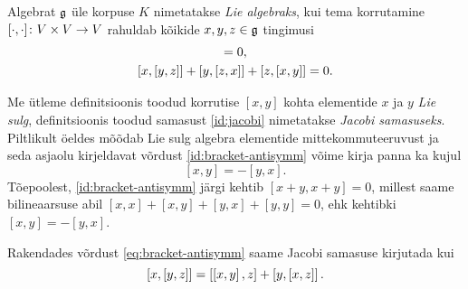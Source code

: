 \begin{dfn}
    Algebrat $\mathfrak{g}$ üle korpuse $K$ nimetatakse \emph{Lie algebraks}, kui
    tema korrutamine $[\cdot, \cdot] \colon V \times V \to V$ rahuldab
    kõikide $x, y, z \in \mathfrak{g}$ tingimusi
    \begin{gather}
        [x, x] = 0,\label{id:bracket-antisymm} \\
        \brac{x}{\brac{y}{z}} + \brac{y}{\brac{z}{x}} +
            \brac{z}{\brac{x}{y}} = 0.\label{id:jacobi}
    \end{gather}
\end{dfn}

Me ütleme definitsioonis toodud korrutise $[x, y]$ kohta elementide $x$ ja
$y$ \emph{Lie sulg}, definitsioonis toodud samasust \eqref{id:jacobi}
nimetatakse \emph{Jacobi samasuseks}. Piltlikult öeldes mõõdab Lie
sulg algebra elementide mittekommuteeruvust ja seda asjaolu kirjeldavat
võrdust \eqref{id:bracket-antisymm} võime kirja panna ka kujul
\begin{equation}\label{eq:bracket-antisymm}
    [x, y] = -[y, x].
\end{equation}
Tõepoolest, \eqref{id:bracket-antisymm} järgi kehtib $[x+y, x+y] = 0$,
millest saame bilineaarsuse abil $[x, x] + [x, y] + [y, x] + [y, y] = 0$,
ehk kehtibki $[x, y] = -[y, x]$.

Rakendades võrdust \eqref{eq:bracket-antisymm} saame Jacobi samasuse
kirjutada kui
\begin{equation}
    \left[ x, \left[ y, z \right] \right] = \left[ \left[ x, y \right], z \right] +
            \left[ y, \left[ x, z \right] \right].
\end{equation}